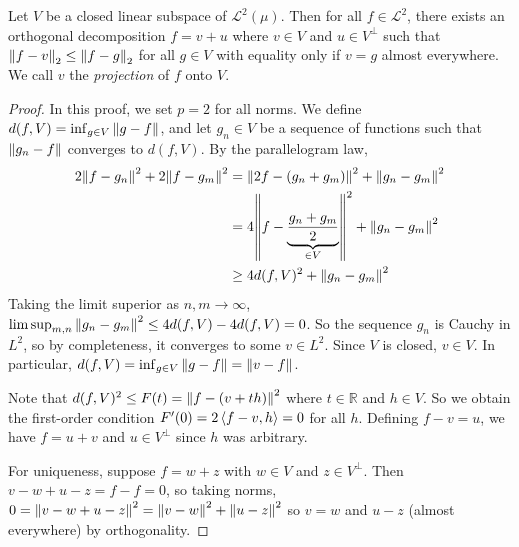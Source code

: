 \begin{theorem}
	Let \( V \) be a closed linear subspace of \( \mathcal L^2(\mu) \).
	Then for all \( f \in \mathcal L^2 \), there exists an orthogonal decomposition \( f = v + u \) where \( v \in V \) and \( u \in V^\perp \) such that \( \norm{f - v}_2 \leq \norm{f - g}_2 \) for all \( g \in V \) with equality only if \( v = g \) almost everywhere.
	We call \( v \) the \emph{projection} of \( f \) onto \( V \).
\end{theorem}
\begin{proof}
	In this proof, we set \( p = 2 \) for all norms.
	We define \( d(f,V) = \inf_{g \in V} \norm{g - f} \), and let \( g_n \in V \) be a sequence of functions such that \( \norm{g_n - f} \) converges to \( d(f,V) \).
	By the parallelogram law,
	\begin{align*}
		2\norm{f - g_n}^2 + 2\norm{f - g_m}^2 &= \norm{2f - (g_n + g_m)}^2 + \norm{g_n - g_m}^2 \\
		&= 4 \norm{f - \underbrace{\frac{g_n + g_m}{2}}_{\in V}}^2 + \norm{g_n - g_m}^2 \\
		&\geq 4 d(f,V)^2 + \norm{g_n - g_m}^2
	\end{align*}
	Taking the limit superior as \( n, m \to \infty \), \( \limsup_{m,n} \norm{g_n - g_m}^2 \leq 4d(f,V) - 4d(f,V) = 0 \).
	So the sequence \( g_n \) is Cauchy in \( L^2 \), so by completeness, it converges to some \( v \in L^2 \).
	Since \( V \) is closed, \( v \in V \).
	In particular, \( d(f,V) = \inf_{g \in V} \norm{g - f} = \norm{v - f} \).

	Note that \( d(f,V)^2 \leq F(t) = \norm{f - (v+th)}^2 \) where \( t \in \mathbb R \) and \( h \in V \).
	So we obtain the first-order condition \( F'(0) = 2\left\langle{f - v, h}\right\rangle = 0 \) for all \( h \).
	Defining \( f - v = u \), we have \( f = u + v \) and \( u \in V^\perp \) since \( h \) was arbitrary.

	For uniqueness, suppose \( f = w + z \) with \( w \in V \) and \( z \in V^\perp \).
	Then \( v - w + u - z = f - f = 0 \), so taking norms, \( 0 = \norm{v - w + u - z}^2 = \norm{v - w}^2 + \norm{u - z}^2 \) so \( v = w \) and \( u - z \) (almost everywhere) by orthogonality.
\end{proof}

